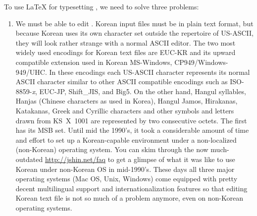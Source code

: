 To use \LaTeX{} for typesetting  , 
we need to solve three problems: 

\begin{enumerate}
\item 
We must be able to 
edit .
Korean input files must be in plain text format, but because Korean
uses its own character set outside the
repertoire of US-ASCII, they will look rather strange with a normal ASCII editor.  The two most widely used encodings for
Korean text files are  EUC-KR and its upward compatible
extension used in Korean MS-Windows, CP949/Windows-949/UHC.
In these encodings each US-ASCII character represents its normal ASCII
character similar to other ASCII compatible encodings such as
ISO-8859-\textit{x}, EUC-JP, Shift\_JIS, and Big5. On the other hand, Hangul
syllables, Hanjas (Chinese characters as used in Korea), Hangul Jamos,
Hirakanas, Katakanas, Greek and Cyrillic characters and other
symbols and letters drawn from KS~X~1001 are represented by two
consecutive octets. The first has its MSB set.
Until mid the 1990's, it took a considerable amount of time and effort to
set up a Korean-capable environment under a non-localized (non-Korean)
operating system. 
You can skim through the now much-outdated \url{http://jshin.net/faq} to get 
a glimpse of what it was like to use Korean under non-Korean OS in mid-1990's.
These days all three major operating systems (Mac OS, Unix, Windows) come equipped
with pretty decent multilingual support and internationalization features
so that editing Korean text file is not so much of a problem anymore, even
on non-Korean operating systems.


\end{enumerate}
